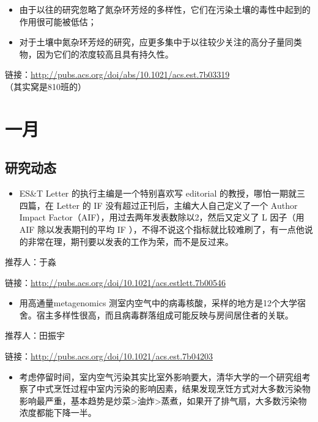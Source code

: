 \documentclass[]{book}
\providecommand{\tightlist}{%
  \setlength{\itemsep}{0pt}\setlength{\parskip}{0pt}}
\begin{document}
\begin{itemize}
\item
  由于以往的研究忽略了氮杂环芳烃的多样性，它们在污染土壤的毒性中起到的作用很可能被低估；
\item
  对于土壤中氮杂环芳烃的研究，应更多集中于以往较少关注的高分子量同类物，因为它们的浓度较高且具有持久性。
\end{itemize}

链接：\url{http://pubs.acs.org/doi/abs/10.1021/acs.est.7b03319}
（其实窝是810班的）

\hypertarget{ux4e00ux6708}{%
\section*{一月}\label{ux4e00ux6708}}

\hypertarget{ux7814ux7a76ux52a8ux6001-2}{%
\subsection*{研究动态}\label{ux7814ux7a76ux52a8ux6001-2}}

\begin{itemize}
\tightlist
\item
  ES\&T Letter 的执行主编是一个特别喜欢写 editorial 的教授，哪怕一期就三四篇，在 Letter 的 IF 没有超过正刊后，主编大人自己定义了一个 Author Impact Factor（AIF），用过去两年发表数除以2，然后又定义了 L 因子（用 AIF 除以发表期刊的平均 IF ），不得不说这个指标就比较难刷了，有一点他说的非常在理，期刊要以发表的工作为荣，而不是反过来。
\end{itemize}

推荐人：于淼

链接：\url{http://pubs.acs.org/doi/10.1021/acs.estlett.7b00546}

\begin{itemize}
\tightlist
\item
  用高通量metagenomics 测室内空气中的病毒核酸，采样的地方是12个大学宿舍。宿主多样性很高，而且病毒群落组成可能反映与房间居住者的关联。
\end{itemize}

推荐人：田振宇

链接：\url{http://pubs.acs.org/doi/10.1021/acs.est.7b04203}

\begin{itemize}
\tightlist
\item
  考虑停留时间，室内空气污染其实比室外影响要大，清华大学的一个研究组考察了中式烹饪过程中室内污染的影响因素，结果发现烹饪方式对大多数污染物影响最严重，基本趋势是炒菜\textgreater{}油炸\textgreater{}蒸煮，如果开了排气扇，大多数污染物浓度都能下降一半。
\end{itemize}
\end{document}

